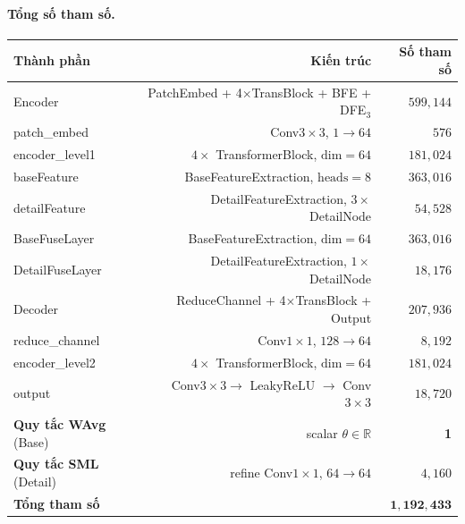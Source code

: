 \paragraph{Tổng số tham số.}
\begin{center}
\setlength{\tabcolsep}{8pt}
\begin{tabular}{lrr}
\toprule
\textbf{Thành phần} & \textbf{Kiến trúc} & \textbf{Số tham số} \\
\midrule
Encoder                         & PatchEmbed + 4$\times$TransBlock + BFE + DFE$_3$ & $599{,}144$ \\
\quad patch\_embed              & Conv$3\!\times\!3$, $1\!\to\!64$                  & $576$ \\
\quad encoder\_level1           & $4\times$ TransformerBlock, $\mathrm{dim}=64$     & $181{,}024$ \\
\quad baseFeature               & BaseFeatureExtraction, $\mathrm{heads}=8$         & $363{,}016$ \\
\quad detailFeature             & DetailFeatureExtraction, $3\times$ DetailNode     & $54{,}528$ \\
\midrule
BaseFuseLayer                   & BaseFeatureExtraction, $\mathrm{dim}=64$          & $363{,}016$ \\
DetailFuseLayer                 & DetailFeatureExtraction, $1\times$ DetailNode     & $18{,}176$ \\
\midrule
Decoder                         & ReduceChannel + 4$\times$TransBlock + Output      & $207{,}936$ \\
\quad reduce\_channel           & Conv$1\!\times\!1$, $128\!\to\!64$               & $8{,}192$ \\
\quad encoder\_level2           & $4\times$ TransformerBlock, $\mathrm{dim}=64$     & $181{,}024$ \\
\quad output                    & Conv$3\!\times\!3 \to$ LeakyReLU $\to$ Conv$3\!\times\!3$ & $18{,}720$ \\
\midrule
\textbf{Quy tắc WAvg} (Base)   & scalar $\theta \in \mathbb{R}$                    & \textbf{1} \\
\textbf{Quy tắc SML} (Detail)  & refine Conv$1\!\times\!1$, $64\!\to\!64$         & $4{,}160$ \\
\midrule
\textbf{Tổng tham số}          &                                                   & $\mathbf{1{,}192{,}433}$ \\
\bottomrule
\end{tabular}
\end{center}


